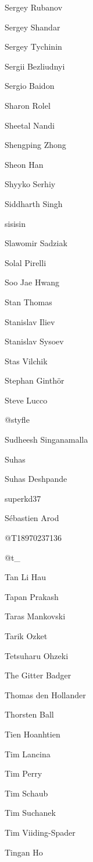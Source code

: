 \begin{DoxyItemize}
\item Sergey Rubanov
\item Sergey Shandar
\item Sergey Tychinin
\item Sergii Bezliudnyi
\item Sergio Baidon
\item Sharon Rolel
\item Sheetal Nandi
\item Shengping Zhong
\item Sheon Han
\item Shyyko Serhiy
\item Siddharth Singh
\item sisisin
\item Slawomir Sadziak
\item Solal Pirelli
\item Soo Jae Hwang
\item Stan Thomas
\item Stanislav Iliev
\item Stanislav Sysoev
\item Stas Vilchik
\item Stephan Ginthör
\item Steve Lucco
\item @styfle
\item Sudheesh Singanamalla
\item Suhas
\item Suhas Deshpande
\item superkd37
\item Sébastien Arod
\item @\+T18970237136
\item @t\+\_\+
\item Tan Li Hau
\item Tapan Prakash
\item Taras Mankovski
\item Tarik Ozket
\item Tetsuharu Ohzeki
\item The Gitter Badger
\item Thomas den Hollander
\item Thorsten Ball
\item Tien Hoanhtien
\item Tim Lancina
\item Tim Perry
\item Tim Schaub
\item Tim Suchanek
\item Tim Viiding-\/\+Spader
\item Tingan Ho

\end{DoxyItemize}
